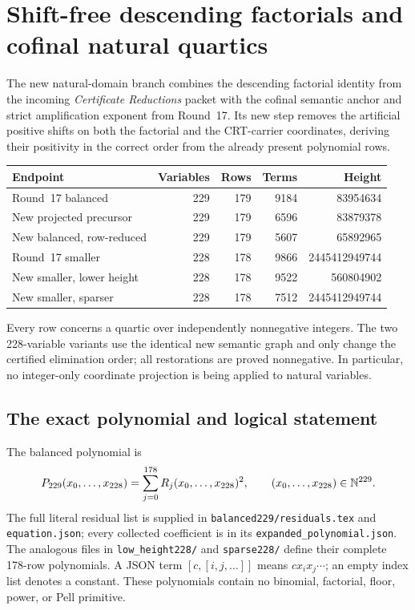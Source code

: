 \section{Shift-free descending factorials and cofinal natural quartics}
\label{sec:shift-free-natural}

The new natural-domain branch combines the descending factorial identity
from the incoming \emph{Certificate Reductions} packet with the cofinal
semantic anchor and strict amplification exponent from Round~17. Its new
step removes the artificial positive shifts on both the factorial and the
CRT-carrier coordinates, deriving their positivity in the correct order
from the already present polynomial rows.

\begin{center}
\begin{tabular}{lrrrr}
\hline
Endpoint & Variables & Rows & Terms & Height\\
\hline
Round~17 balanced &229&179&9184&83954634\\
New projected precursor &229&179&6596&83879378\\
New balanced, row-reduced &229&179&5607&65892965\\
Round~17 smaller &228&178&9866&2445412949744\\
New smaller, lower height &228&178&9522&560804902\\
New smaller, sparser &228&178&7512&2445412949744\\
\hline
\end{tabular}
\end{center}
Every row concerns a quartic over independently nonnegative integers.
The two 228-variable variants use the identical new semantic graph and
only change the certified elimination order; all restorations are proved
nonnegative. In particular, no integer-only coordinate projection is
being applied to natural variables.

\subsection{The exact polynomial and logical statement}
The balanced polynomial is
\[
 P_{229}(x_0,\ldots,x_{228})=\sum_{j=0}^{178}R_j(x_0,\ldots,x_{228})^2,
 \qquad (x_0,\ldots,x_{228})\in\mathbb N^{229}.
\]
The full literal residual list is supplied in
\texttt{balanced229/residuals.tex} and \texttt{equation.json}; every collected
coefficient is in its \texttt{expanded\_polynomial.json}. The analogous files
in \texttt{low\_height228/} and \texttt{sparse228/} define their complete
178-row polynomials. A JSON term \([c,[i,j,\ldots]]\) means
\(c x_i x_j\cdots\); an empty index list denotes a constant. These
polynomials contain no binomial, factorial, floor, power, or Pell primitive.

